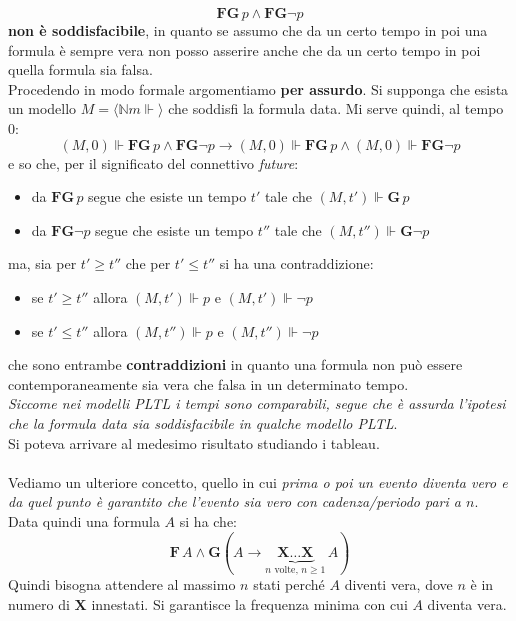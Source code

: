 \documentclass[a4paper,12pt, oneside]{book}
\begin{document}
\[\mathbf{FG}\,p\land \mathbf{FG}\neg p\]
\textbf{non è soddisfacibile}, in quanto se assumo che da un certo tempo in poi
una formula è sempre vera non posso asserire anche che da un certo tempo in poi
quella formula sia falsa.\\
Procedendo in modo formale argomentiamo \textbf{per assurdo}.
Si supponga che esista un modello $M=\langle \mathbb{N}m\Vdash\rangle$ che
soddisfi la formula data. Mi serve quindi, al tempo 0:
\[(M,0)\Vdash \mathbf{FG}\,p\land \mathbf{FG}\neg p\to (M,0)\Vdash
  \mathbf{FG}\,p\land (M,0)\Vdash \mathbf{FG}\neg p\]
e so che, per il significato del connettivo \emph{future}:
\begin{itemize}
  \item da $\mathbf{FG}\,p$ segue che esiste un tempo $t'$ tale che
  $(M,t')\Vdash\mathbf{G}\,p$
  \item da $\mathbf{FG}\neg p$ segue che esiste un tempo $t''$ tale che
  $(M,t'')\Vdash\mathbf{G}\neg p$
\end{itemize}
ma, sia per $t'\geq t''$ che per $t'\leq t''$ si ha una contraddizione:
\begin{itemize}
  \item se $t'\geq t''$ allora $(M,t')\Vdash p$ e $(M,t')\Vdash \neg p$
  \item se $t'\leq t''$ allora $(M,t'')\Vdash p$ e $(M,t'')\Vdash \neg p$
\end{itemize}
che sono entrambe \textbf{contraddizioni} in quanto una formula non può essere
contemporaneamente sia vera che falsa in un determinato tempo.\\
\textit{Siccome nei modelli PLTL i tempi sono comparabili, segue che è assurda
  l’ipotesi che la formula data sia soddisfacibile in qualche modello PLTL}.\\
Si poteva arrivare al medesimo risultato studiando i tableau.\\\\
Vediamo un ulteriore concetto, quello in cui \textit{prima o poi un evento
  diventa vero e da quel punto è garantito che l'evento sia vero con
  cadenza/periodo pari a $n$}. Data quindi una formula $A$ si ha che:
\[\mathbf{F}\,A\land\mathbf{G}(A\to\underbrace{
    \mathbf{X}\ldots\mathbf{X}}_{n\mbox{ volte, } n\geq 1}\,A)\]
Quindi bisogna attendere al massimo $n$ stati perché $A$ diventi vera, dove $n$
è in numero di $\mathbf{X}$ innestati. Si garantisce la frequenza minima con cui
$A$ diventa vera.
\end{document}
